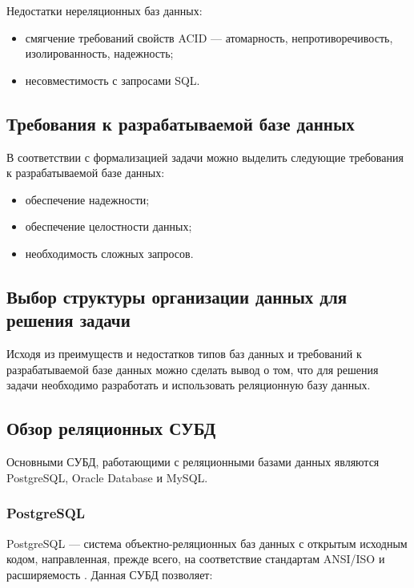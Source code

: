 Недостатки нереляционных баз данных:

\begin{itemize}
	\item смягчение требований свойств ACID --- атомарность, непротиворечивость, изолированность, надежность;
	\item несовместимость с запросами SQL.
\end{itemize}

\subsection{Требования к разрабатываемой базе данных}

В соответствии с формализацией задачи можно выделить следующие требования к разрабатываемой базе данных:

\begin{itemize}
	\item обеспечение надежности;
	\item обеспечение целостности данных;
	\item необходимость сложных запросов.
\end{itemize}

\subsection{Выбор структуры организации данных для решения задачи}

Исходя из преимуществ и недостатков типов баз данных и требований к разрабатываемой базе данных можно сделать вывод о том, что для решения задачи необходимо разработать и использовать реляционную базу данных.

\subsection{Обзор реляционных СУБД}

Основными СУБД, работающими с реляционными базами данных являются PostgreSQL, Oracle Database и MySQL.

\subsubsection{PostgreSQL}

PostgreSQL --- система объектно-реляционных баз данных с открытым исходным кодом, направленная, прежде всего, на соответствие стандартам ANSI/ISO и расширяемость \cite{postgresql}. Данная СУБД позволяет:

